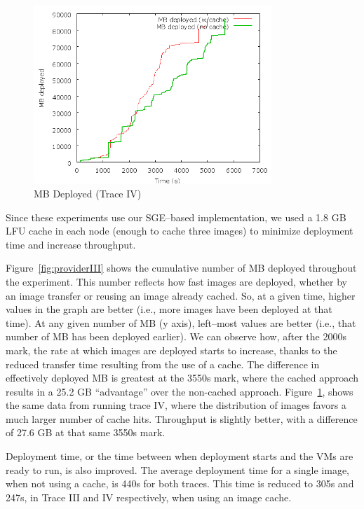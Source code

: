 \begin{figure}
  \begin{center}
    \includegraphics[width=0.8\textwidth]{figures/ProviderPerspective-Pareto2.png}
    \caption{MB Deployed (Trace IV)}
	\label{fig:providerIV}
  \end{center}
\end{figure}

Since these experiments use our SGE--based implementation, we used a 1.8 GB
LFU cache in each node (enough to cache three images) to minimize deployment time and increase throughput.

Figure~\ref{fig:providerIII} shows the cumulative number of MB deployed throughout the experiment. This number reflects how fast images are deployed, whether by an image transfer or reusing an image already cached. So, at a given time, higher values in the graph are better (i.e., more images have been deployed at that time). At any given number of MB (y axis), left--most values are better (i.e., that number of MB has been deployed earlier). We can observe how, after the 2000s mark, the rate at
which images are deployed starts to increase, thanks to the reduced
transfer time resulting from the use of a cache. The difference in
effectively deployed MB is greatest at the 3550s mark, where the cached
approach results in a 25.2 GB ``advantage'' over the non{}-cached
approach. Figure~\ref{fig:providerIV}, shows the same data from running trace IV, where
the distribution of images favors a much larger number of cache hits.
Throughput is slightly better, with a difference of 27.6 GB at that
same 3550s mark.

Deployment time, or the time between when deployment starts and the VMs are ready to run, is also improved. The average
deployment time for a single image, when not using a cache, is 440s for
both traces. This time is reduced to 305s and 247s, in Trace III and IV
respectively, when using an image cache.

